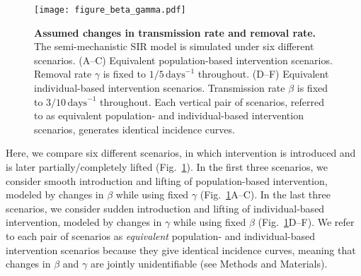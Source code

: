 \documentclass[12pt]{article}
\newcommand{\fref}[1]{Fig.~\ref{fig:#1}}
\begin{document}
\begin{figure}[!ht]
\texttt{[image: figure\_beta\_gamma.pdf]}
\caption{
\textbf{Assumed changes in transmission rate and removal rate.}
The semi-mechanistic SIR model is simulated under six different scenarios.
(A--C) Equivalent population-based intervention scenarios.
Removal rate $\gamma$ is fixed to $1/5\,\textrm{days}^{-1}$ throughout.
(D--F) Equivalent individual-based intervention scenarios.
Transmission rate $\beta$ is fixed to $3/10\,\textrm{days}^{-1}$ throughout.
Each vertical pair of scenarios, referred to as equivalent population- and individual-based intervention scenarios, generates identical incidence curves.
}
\label{fig:assumption}
\end{figure}

Here, we compare six different scenarios, in which intervention is introduced and is later partially/completely lifted (\fref{assumption}).
In the first three scenarios, we consider smooth introduction and lifting of population-based intervention, modeled by changes in $\beta$ while using fixed $\gamma$ (\fref{assumption}A--C).
In the last three scenarios, we consider sudden introduction and lifting of individual-based intervention, modeled by changes in $\gamma$ while using fixed $\beta$ (\fref{assumption}D--F).
We refer to each pair of scenarios as \emph{equivalent} population- and individual-based intervention scenarios because they give identical incidence curves, meaning that changes in $\beta$ and $\gamma$ are jointly unidentifiable (see Methods and Materials).
\end{document}
